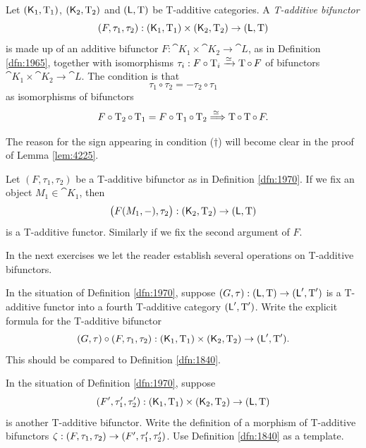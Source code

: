 \begin{dfn} \label{dfn:1970}
Let $(\operatorname{\mathsf{K}}_1, \operatorname{T}_1)$, $(\operatorname{\mathsf{K}}_2, \operatorname{T}_2)$ 
and $(\operatorname{\mathsf{L}}, \operatorname{T})$ be T-additive categories. 
A {\em T-additive bifunctor} 
\[ (F, \tau_1, \tau_2) : (\operatorname{\mathsf{K}}_1, \operatorname{T}_1) \times (\operatorname{\mathsf{K}}_2, \operatorname{T}_2) 
\to (\operatorname{\mathsf{L}}, \operatorname{T}) \]
is made up of an additive bifunctor 
$F : \cat{K}_1 \times \cat{K}_2 \to \cat{L}$,
as in Definition \ref{dfn:1965}, together with isomorphisms 
$\tau_i : F \circ \operatorname{T}_i \xrightarrow{\simeq} \operatorname{T} \circ \, F$ 
of bifunctors 
$\cat{K}_1 \times \cat{K}_2 \to \cat{L}$. 
The condition is that 
\begin{equation*} \tag{$\dag$}
\tau_1 \circ \tau_2 = - \tau_2 \circ \tau_1 
\end{equation*}
as isomorphisms of bifunctors 
\[ F \circ \operatorname{T}_2 \circ \operatorname{T}_1 = F \circ \operatorname{T}_1 \circ \operatorname{T}_2 
\stackrel{\simeq\ }{\Longrightarrow} \operatorname{T} \circ \operatorname{T} \circ \, F . \]
\end{dfn}

The reason for the sign appearing in condition ($\dag$) will become clear 
in the proof of Lemma \ref{lem:4225}. 

Let $(F, \tau_1, \tau_2)$ be a T-additive bifunctor as in Definition 
\ref{dfn:1970}. If we fix an object $M_1 \in \cat{K}_{1}$, then 
\[ \bigl( F(M_1, -), \tau_2 \bigr) :  (\operatorname{\mathsf{K}}_2, \operatorname{T}_2) \to 
(\operatorname{\mathsf{L}}, \operatorname{T}) \]
is a T-additive functor. Similarly if we fix the second argument of $F$. 

In the next exercises we let the reader establish several operations on 
T-additive bifunctors. 

\begin{exer} \label{exer:1975}
In the situation of Definition \ref{dfn:1970}, suppose 
$(G, \tau) : (\operatorname{\mathsf{L}}, \operatorname{T}) \to (\operatorname{\mathsf{L}}', \operatorname{T}')$
is a T-additive functor into a fourth T-additive category 
$(\operatorname{\mathsf{L}}', \operatorname{T}')$. Write the explicit formula for the T-additive bifunctor 
\[ (G, \tau) \circ (F, \tau_1, \tau_2) : 
(\operatorname{\mathsf{K}}_1, \operatorname{T}_1) \times (\operatorname{\mathsf{K}}_2, \operatorname{T}_2) 
\to (\operatorname{\mathsf{L}}', \operatorname{T}') . \]
This should be compared to Definition \ref{dfn:1840}. 
\end{exer}

\begin{exer} \label{exer:1976}
In the situation of Definition \ref{dfn:1970}, suppose 
\[ (F', \tau'_1, \tau'_2) : (\operatorname{\mathsf{K}}_1, \operatorname{T}_1) \times 
(\operatorname{\mathsf{K}}_2, \operatorname{T}_2) \to (\operatorname{\mathsf{L}}, \operatorname{T}) \]
is another T-additive bifunctor. Write the definition of a morphism of 
T-additive bifunctors 
$\zeta : (F, \tau_1, \tau_2) \to (F', \tau'_1, \tau'_2)$.
Use Definition \ref{dfn:1840} as a template. 
\end{exer}

